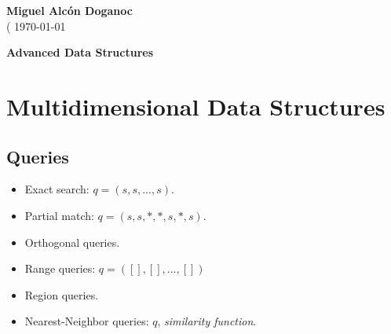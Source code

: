 \documentclass[a4paper, 10pt]{article}
\begin{document}
\noindent
\begin{flushright}
    \large\textbf{Miguel Alcón Doganoc} \\(
    \today %
\end{flushright}

\noindent
{\huge{\textbf{Advanced Data Structures}}}
\section{Multidimensional Data Structures}
\subsection{Queries}
\begin{itemize}
    \item Exact search: $q=(s,s,...,s)$.
    \item Partial match: $q=(s,s,*,*,s,*,s)$.
    \item Orthogonal queries.
    \item Range queries: $q=([],[],...,[])$
    \item Region queries.
    \item Nearest-Neighbor queries: $q$, \textit{similarity function}.
\end{itemize}
\end{document}
